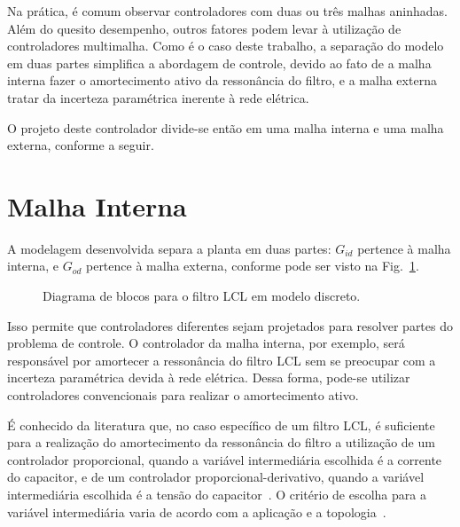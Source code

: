   Na prática, é comum observar controladores com duas ou três malhas aninhadas. Além do quesito desempenho, outros fatores podem levar à utilização de controladores multimalha. Como é o caso deste trabalho, a separação do modelo em duas partes simplifica a abordagem de controle, devido ao fato de a malha interna fazer o amortecimento ativo da ressonância do filtro, e a malha externa tratar da incerteza paramétrica inerente à rede elétrica.

  O projeto deste controlador divide-se então em uma malha interna e uma malha externa, conforme a seguir.

\section{Malha Interna}

  A modelagem desenvolvida separa a planta em duas partes: $G_{id}$ pertence à malha interna, e $G_{od}$ pertence à malha externa, conforme pode ser visto na Fig.~\ref{fig:LCL_discreto}.

  \begin{figure}[htb]
    \centering{
      \def\svgwidth{\textwidth}
      }
    \renewcommand\figurename{Fig.}
    \caption{Diagrama de blocos para o filtro LCL em modelo discreto.}
    \label{fig:LCL_discreto}
  \end{figure}

  Isso permite que controladores diferentes sejam projetados para resolver partes do problema de controle. O controlador da malha interna, por exemplo, será responsável por amortecer a ressonância do filtro LCL sem se preocupar com a incerteza paramétrica devida à rede elétrica. Dessa forma, pode-se utilizar controladores convencionais para realizar o amortecimento ativo.

  É conhecido da literatura que, no caso específico de um filtro LCL, é suficiente para a realização do amortecimento da ressonância do filtro a utilização de um controlador proporcional, quando a variável intermediária escolhida é a corrente do capacitor, e de um controlador proporcional-derivativo, quando a variável intermediária escolhida é a tensão do capacitor~\cite{ref:DANNEHL}. O critério de escolha para a variável intermediária varia de acordo com a aplicação e a topologia~\cite{ref:POH}.

